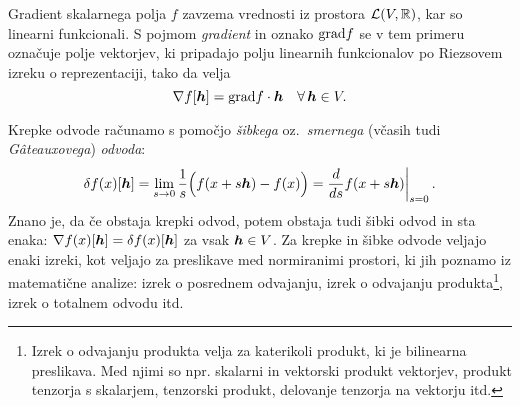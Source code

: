 Gradient skalarnega polja $f$ zavzema vrednosti iz prostora $\mathcal L(V,\mathbb R)$, kar so linearni funkcionali.
S pojmom \emph{gradient} in oznako $\mathrm{grad} f$ se v tem primeru označuje polje vektorjev, ki pripadajo polju
linearnih funkcionalov po Riezsovem izreku o reprezentaciji, tako da velja
\[ \nabla f[\boldsymbol h]=\mathrm{grad} f \cdot \boldsymbol h \quad \forall\, \boldsymbol h\in V. \]

Krepke odvode računamo s pomočjo \emph{šibkega} oz.~\emph{smernega} (včasih tudi \emph{Gâteauxovega}) \emph{odvoda}:
\begin{equation*}
	\delta f(x)[\vek{h}]=\lim_{s\to 0}\frac{1}{s}\Big(f(x+s\vek{h})-f(x)\Big)=
	\at{\frac{d}{ds}f(x+s\vek{h})}{s=0}.
\end{equation*}
Znano je, da če obstaja krepki odvod,
potem obstaja tudi šibki odvod in sta enaka: $\nabla f(x)[\boldsymbol h]=\delta f(x)[\boldsymbol h]$ za vsak $\boldsymbol h\in V$.
Za krepke in šibke odvode veljajo enaki izreki, kot veljajo za preslikave med normiranimi prostori, ki jih
poznamo iz matematične analize: izrek o posrednem odvajanju, izrek o odvajanju produkta\footnote{
Izrek o odvajanju produkta velja za katerikoli produkt, ki je bilinearna preslikava. Med njimi so
npr. skalarni in vektorski produkt vektorjev, produkt tenzorja s skalarjem, tenzorski produkt,
delovanje tenzorja na vektorju itd.},
izrek o totalnem odvodu itd.

